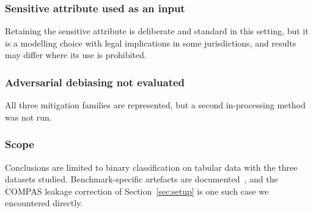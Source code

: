\subsubsection{Sensitive attribute used as an input}
Retaining the sensitive attribute is deliberate and standard in this setting,
but it is a modelling choice with legal implications in some jurisdictions,
and results may differ where its use is prohibited.

\subsubsection{Adversarial debiasing not evaluated}
All three mitigation families are represented, but a second in-processing
method~\cite{zhang2018mitigating} was not run.

\subsubsection{Scope}
Conclusions are limited to binary classification on tabular data with the
three datasets studied. Benchmark-specific artefacts are
documented~\cite{bao2021its,ding2021retiring,fabris2022algorithmic}, and the
COMPAS leakage correction of Section~\ref{sec:setup} is one such case we
encountered directly.

